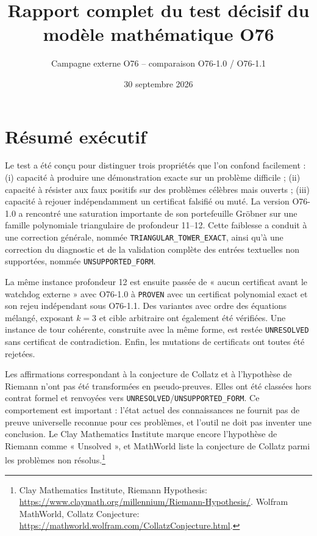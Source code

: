 \documentclass[11pt,a4paper]{article}
\title{Rapport complet du test décisif du modèle mathématique O76}
\author{Campagne externe O76 -- comparaison O76-1.0 / O76-1.1}
\date{30 septembre 2026}
\newcommand{\Proven}{\texttt{PROVEN}}
\newcommand{\Unresolved}{\texttt{UNRESOLVED}}
\begin{document}
\maketitle
\tableofcontents

\section{Résumé exécutif}
Le test a été conçu pour distinguer trois propriétés que l'on confond facilement : (i) capacité à produire une démonstration exacte sur un problème difficile ; (ii) capacité à résister aux faux positifs sur des problèmes célèbres mais ouverts ; (iii) capacité à rejouer indépendamment un certificat falsifié ou muté. La version O76-1.0 a rencontré une saturation importante de son portefeuille Gröbner sur une famille polynomiale triangulaire de profondeur 11--12. Cette faiblesse a conduit à une correction générale, nommée \texttt{TRIANGULAR\_TOWER\_EXACT}, ainsi qu'à une correction du diagnostic et de la validation complète des entrées textuelles non supportées, nommée \texttt{UNSUPPORTED\_FORM}.

La même instance profondeur 12 est ensuite passée de « aucun certificat avant le watchdog externe » avec O76-1.0 à \Proven{} avec un certificat polynomial exact et son rejeu indépendant sous O76-1.1. Des variantes avec ordre des équations mélangé, exposant $k=3$ et cible arbitraire ont également été vérifiées. Une instance de tour cohérente, construite avec la même forme, est restée \Unresolved{} sans certificat de contradiction. Enfin, les mutations de certificats ont toutes été rejetées.

Les affirmations correspondant à la conjecture de Collatz et à l'hypothèse de Riemann n'ont pas été transformées en pseudo-preuves. Elles ont été classées hors contrat formel et renvoyées vers \Unresolved{}/\texttt{UNSUPPORTED\_FORM}. Ce comportement est important : l'état actuel des connaissances ne fournit pas de preuve universelle reconnue pour ces problèmes, et l'outil ne doit pas inventer une conclusion. Le Clay Mathematics Institute marque encore l'hypothèse de Riemann comme « Unsolved », et MathWorld liste la conjecture de Collatz parmi les problèmes non résolus.\footnote{Clay Mathematics Institute, Riemann Hypothesis: \url{https://www.claymath.org/millennium/Riemann-Hypothesis/}. Wolfram MathWorld, Collatz Conjecture: \url{https://mathworld.wolfram.com/CollatzConjecture.html}.}
\end{document}
